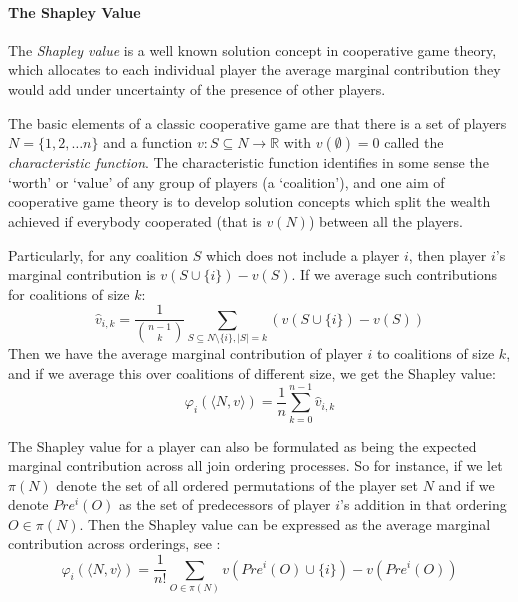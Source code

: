 \documentclass[
10pt, %
a4paper, %
oneside, %
headinclude,footinclude, %
BCOR5mm, %
]{scrartcl}
\begin{document}
\paragraph{The Shapley Value}

The \textit{Shapley value} is a well known solution concept in cooperative game theory, which allocates to each individual player the average marginal contribution they would add under uncertainty of the presence of other players.

The basic elements of a classic cooperative game are that there is a set of players$N=\{1,2,\dots n\}$ and a function $v: S\subseteq N \rightarrow \mathbb{R}$ with $v(\emptyset)=0$ called the \textit{characteristic function}.
The characteristic function identifies in some sense the `worth' or `value' of any group of players (a `coalition'), and one aim of cooperative game theory is to develop solution concepts which split the wealth achieved if everybody cooperated (that is $v(N)$) between all the players.

Particularly, for any coalition $S$ which does not include a player $i$, then player $i$'s marginal contribution is $v(S\cup\{i\}) - v(S)$. If we average such contributions for coalitions of size $k$:
\begin{equation}\label{shapley_value1}
\hat{v}_{i,k} = \frac{1}{\binom{n-1}{k}}\sum_{S\subseteq N\setminus \{ i\} , |S|=k} %
(v(S\cup\{i\})-v(S))
\end{equation}
Then we have the average marginal contribution of player $i$ to coalitions of size $k$, and if we average this over coalitions of different size, we get the Shapley value:
\begin{equation}\label{shapley_value2} \varphi_i(\langle N,v\rangle) = \frac{1}{n}\sum_{k=0}^{n-1}\hat{v}_{i,k} \end{equation}

The Shapley value for a player can also be formulated as being the expected marginal contribution across all join ordering processes.
So for instance, if we let $\pi(N)$ denote the set of all ordered permutations of the player set $N$ and if we denote $Pre^i(O)$ as the set of predecessors of player $i$'s addition in that ordering $O\in \pi(N)$. Then the Shapley value can be expressed as the average marginal contribution across orderings, see \cite{weber_1988}:
\begin{equation}\label{shapley_value3}
    \varphi_i(\langle N,v\rangle) = \frac{1}{n!}\sum_{O\in\pi(N)}v(Pre^i(O)\cup\{i\})-v(Pre^i(O))
\end{equation}
\end{document}
